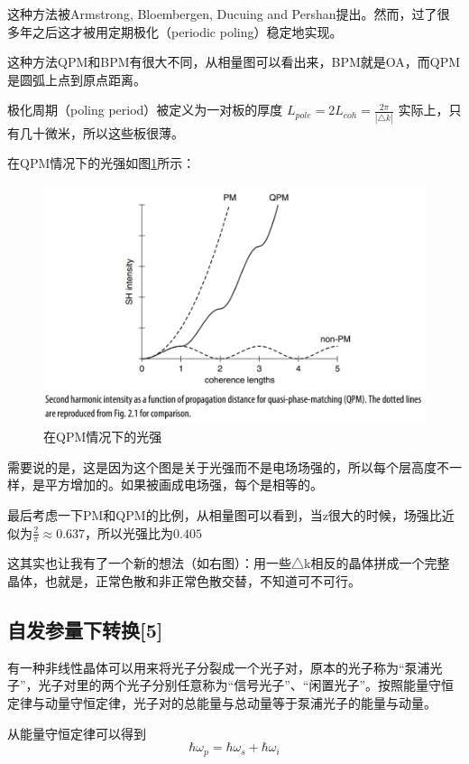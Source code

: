 这种方法被Armstrong, Bloembergen, Ducuing and Pershan提出。然而，过了很多年之后这才被用定期极化（periodic poling）稳定地实现。

这种方法QPM和BPM有很大不同，从相量图可以看出来，BPM就是OA，而QPM是圆弧上点到原点距离。

极化周期（poling period）被定义为一对板的厚度
$L_{pole}=2L_{coh}=\frac{2\pi}{\left|\triangle k\right|}$
实际上，只有几十微米，所以这些板很薄。

在QPM情况下的光强如图\ref{fig:QFM2}所示：

\begin{figure}[ht]
	\centering
	\includegraphics[scale=0.3]{pic/QFM2}
	\caption{在QPM情况下的光强}
	\label{fig:QFM2}
\end{figure}

需要说的是，这是因为这个图是关于光强而不是电场场强的，所以每个层高度不一样，是平方增加的。如果被画成电场强，每个是相等的。


最后考虑一下PM和QPM的比例，从相量图可以看到，当z很大的时候，场强比近似为$\frac{2}{\pi}\approx0.637$，所以光强比为$0.405$

这其实也让我有了一个新的想法（如右图）：用一些△k相反的晶体拼成一个完整晶体，也就是，正常色散和非正常色散交替，不知道可不可行。

\subsection{自发参量下转换[5]}
有一种非线性晶体可以用来将光子分裂成一个光子对，原本的光子称为“泵浦光子”，光子对里的两个光子分别任意称为“信号光子”、“闲置光子”。按照能量守恒定律与动量守恒定律，光子对的总能量与总动量等于泵浦光子的能量与动量。

从能量守恒定律可以得到\[\hbar\omega_p=\hbar\omega_s+\hbar\omega_i\]

